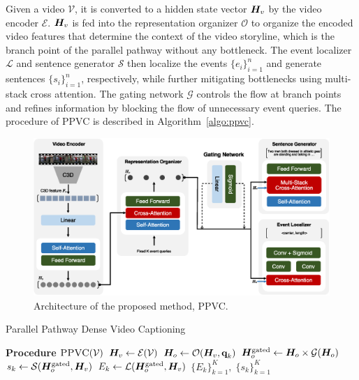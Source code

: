 Given a video $\mathcal{V}$, it is converted to a hidden state vector $\bm{H}_v$ by the video encoder $\mathcal{E}$.
$\bm{H}_v$ is fed into the representation organizer $\mathcal{O}$ to organize the encoded video features that determine the context of the video storyline, which is the branch point of the parallel pathway without any bottleneck.
The event localizer $\mathcal{L}$ and sentence generator $\mathcal{S}$ then localize the events $\{e_i\}_{i=1}^{n}$ and generate sentences $\{s_i\}_{i=1}^{n}$, respectively, while further mitigating bottlenecks using multi-stack cross attention.
The gating network $\mathcal{G}$ controls the flow at branch points and refines information by blocking the flow of unnecessary event queries.
The procedure of PPVC is described in Algorithm~\ref{algo:ppvc}.

\begin{figure}[t]
  \centering
   \includegraphics[width=\linewidth]{figures/ppvc_fig2}
   \caption{
    Architecture of the proposed method, PPVC.
   }
  \label{fig:architecture}
\end{figure}

\begin{algorithm}[t]
  \caption{Parallel Pathway Dense Video Captioning}
  \label{algo:ppvc}
  \begin{algorithmic}[1]
    \STATE \textbf{Procedure} $\textsc{PPVC}(\mathcal{V})$
    \STATE $\bm{H}_v \gets \mathcal{E}(\mathcal{V})$ 
      \STATE $\bm{H}_o \gets \mathcal{O}(\bm{H}_v, \textbf{q}_k)$ 
      \STATE $\bm{H}_o^{\text{gated}} \gets \bm{H}_o \times \mathcal{G}(\bm{H}_o)$ 
      \STATE {}
      \STATE $s_{k} \gets \mathcal{S}(\bm{H}_o^{\text{gated}}, \bm{H}_v)$ 
      \STATE $E_{k} \gets \mathcal{L}(\bm{H}_o^{\text{gated}}, \bm{H}_v)$ 
    \ENDFOR
    \RETURN $\{E_{k}\}_{k=1}^{K},\;\{s_{k}\}_{k=1}^{K}$
  \end{algorithmic}
\end{algorithm}

